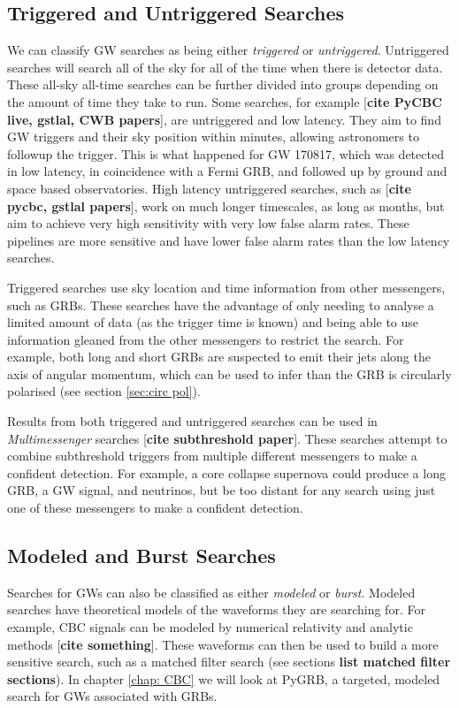 \documentclass[11pt]{cuthesis}
\begin{document}
\subsection{Triggered and Untriggered Searches}
We can classify GW searches as being either \textit{triggered} or \textit{untriggered}. Untriggered searches will search all of the sky for all of the time when there is detector data. These all-sky all-time searches can be further divided into groups depending on the amount of time they take to run. Some searches, for example [\textbf{cite PyCBC live, gstlal, CWB papers}], are untriggered and low latency. They aim to find GW triggers and their sky position within minutes, allowing astronomers to followup the trigger. This is what happened for GW 170817, which was detected in low latency, in coincidence with a Fermi GRB, and followed up by ground and space based observatories. High latency untriggered  searches, such as [\textbf{cite pycbc, gstlal papers}], work on much longer timescales, as long as months, but aim to achieve very high sensitivity with very low false alarm rates. These pipelines are more sensitive and have lower false alarm rates than the low latency searches. 

Triggered searches use sky location and time information from other messengers, such as GRBs. These searches have the advantage of only needing to analyse a limited amount of data (as the trigger time is known) and being able to use information gleaned from the other messengers to restrict the search. For example, both long and short GRBs are suspected to emit their jets along the axis of angular momentum, which can be used to infer than the GRB is circularly polarised (see section \ref{sec:circ pol}). 

Results from both triggered and untriggered searches can be used in \textit{Multimessenger} searches [\textbf{cite subthreshold paper}]. These searches attempt to combine subthreshold triggers from multiple different messengers to make a confident detection. For example, a core collapse supernova could produce a long GRB, a GW signal, and neutrinos, but be too distant for any search using just one of these messengers to make a confident detection. 

\subsection{Modeled and Burst Searches}
Searches for GWs can also be classified as either \textit{modeled} or \textit{burst}. Modeled searches have theoretical models of the waveforms they are searching for. For example, CBC signals can be modeled by numerical relativity and analytic methods [\textbf{cite something}]. These waveforms can then be used to build a more sensitive search, such as a matched filter search (see sections \textbf{list matched filter sections}). In chapter \ref{chap: CBC} we will look at PyGRB, a targeted, modeled search for GWs associated with GRBs. 
\end{document}
